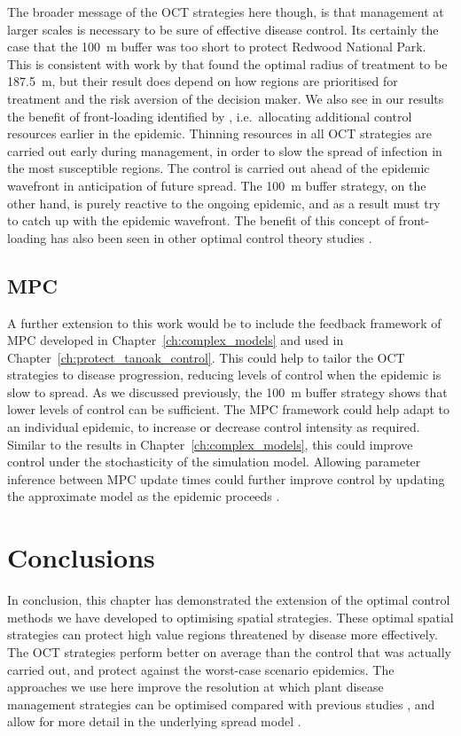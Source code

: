 The broader message of the OCT strategies here though, is that management at larger scales is necessary to be sure of effective disease control. Its certainly the case that the \SI{100}{\meter} buffer was too short to protect Redwood National Park. This is consistent with work by \citet{cunniffe_modelling_2016} that found the optimal radius of treatment to be \SI{187.5}{\meter}, but their result does depend on how regions are prioritised for treatment and the risk aversion of the decision maker. We also see in our results the benefit of front-loading identified by \citet{cunniffe_modelling_2016}, i.e.\ allocating additional control resources earlier in the epidemic. Thinning resources in all OCT strategies are carried out early during management, in order to slow the spread of infection in the most susceptible regions. The control is carried out ahead of the epidemic wavefront in anticipation of future spread. The \SI{100}{\meter} buffer strategy, on the other hand, is purely reactive to the ongoing epidemic, and as a result must try to catch up with the epidemic wavefront. The benefit of this concept of front-loading has also been seen in other optimal control theory studies \citep{behncke_optimal_2000}.

\subsection{MPC}

A further extension to this work would be to include the feedback framework of MPC developed in Chapter~\ref{ch:complex_models} and used in Chapter~\ref{ch:protect_tanoak_control}. This could help to tailor the OCT strategies to disease progression, reducing levels of control when the epidemic is slow to spread. As we discussed previously, the \SI{100}{\meter} buffer strategy shows that lower levels of control can be sufficient. The MPC framework could help adapt to an individual epidemic, to increase or decrease control intensity as required. Similar to the results in Chapter~\ref{ch:complex_models}, this could improve control under the stochasticity of the simulation model. Allowing parameter inference between MPC update times could further improve control by updating the approximate model as the epidemic proceeds \citep{thompson_control_2018}.

\section{Conclusions}

In conclusion, this chapter has demonstrated the extension of the optimal control methods we have developed to optimising spatial strategies. These optimal spatial strategies can protect high value regions threatened by disease more effectively. The OCT strategies perform better on average than the control that was actually carried out, and protect against the worst-case scenario epidemics. The approaches we use here improve the resolution at which plant disease management strategies can be optimised compared with previous studies \citep[c.f.][]{forster_optimizing_2007}, and allow for more detail in the underlying spread model \citep[c.f.][]{epanchin_optimal_2012}.